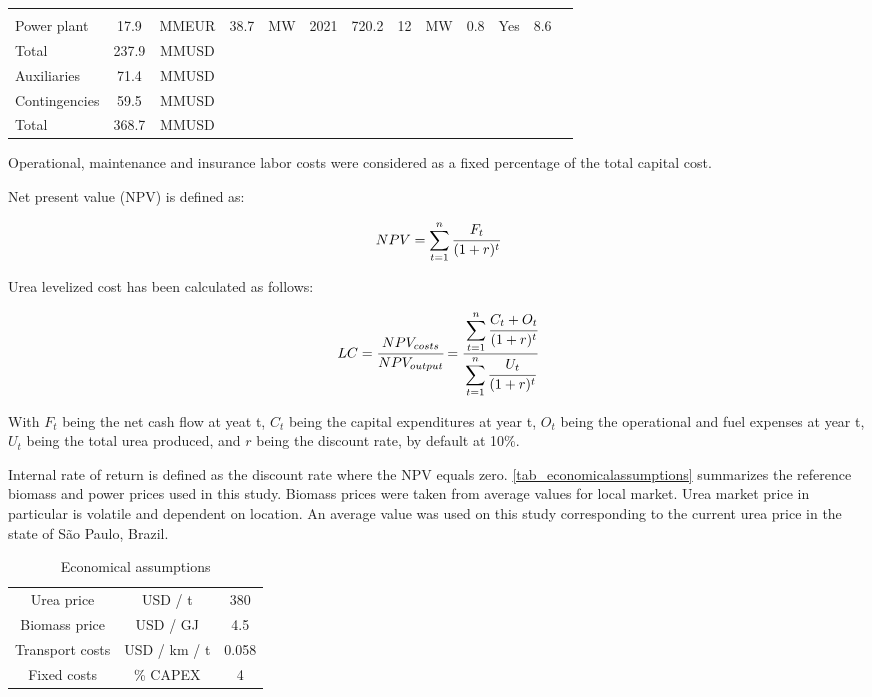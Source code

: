 \documentclass[a4paper, titlepage]{article}
\begin{document}
\begin{table}
\begin{tabular}{|| C{2.3cm} | c | c | c | c | C{1.4cm} | C{1.2cm} | c | c | C{0.9cm} | C{1.4cm} | C{1.5cm} | C{0.9cm} ||}
		\cite{swansonTechnoeconomicAnalysisBiomasstoliquids2010} \\
		Power plant & 17.9 & MMEUR & 38.7 & MW & 2021 & 720.2 & 12 & MW & 0.8 & Yes & 8.6 &
		\cite{cloeteCosteffectiveCleanAmmonia2021} \\
		\hline
		Total & 237.9 & MMUSD & & & & & & & & & & \\
		Auxiliaries & 71.4 & MMUSD & & & & & & & & & & \\
		Contingencies & 59.5 & MMUSD & & & & & & & & & & \\
		\hline
		Total & 368.7 & MMUSD & & & & & & & & & & \\
		\hline
	\end{tabular}

\end{table}

Operational, maintenance and insurance labor costs were considered as a fixed percentage of the total capital cost.

Net present value (NPV) is defined as:

\begin{equation}
	NPV = \sum_{t=1}^n \cfrac{F_t}{(1+r)^t}
\end{equation}

Urea levelized cost has been calculated as follows:

\begin{equation}
	LC = \cfrac{NPV_{costs}}{NPV_{output}} = \cfrac{\displaystyle\sum_{t=1}^n \cfrac{C_t + O_t}{(1+r)^t}}{\displaystyle\sum_{t=1}^n \cfrac{U_t}{(1+r)^t}}
\end{equation}

With $F_t$ being the net cash flow at yeat t, $C_t$ being the capital expenditures at year t, $O_t$ being the
operational and fuel expenses at year t, $U_t$ being the total urea produced, and $r$ being the discount rate,
by default at 10\%.

Internal rate of return is defined as the discount rate where the NPV equals zero.
\autoref{tab_economicalassumptions} summarizes the reference biomass and power prices used in this study. 
Biomass prices were taken from average values for local market. Urea market price in particular is volatile and 
dependent on location. An average value was used on this study corresponding to the current urea price in the state of
São Paulo, Brazil.

\begin{table}
	\centering
	\caption{Economical assumptions}
	\label{tab_economicalassumptions}
	\begin{tabular}{|c | c | c |}
		\hline
		Urea price & USD / t & 380 \\
		Biomass price & USD / GJ & 4.5 \\
		Transport costs & USD / km / t & 0.058 \\
		Fixed costs & \% CAPEX & 4 \\
	\hline	
	\end{tabular}
\end{table}
\end{document}

